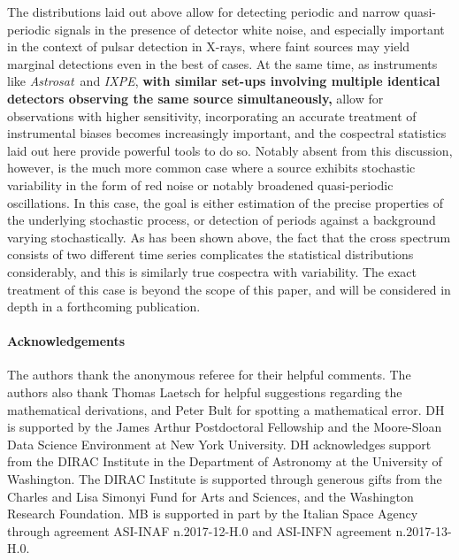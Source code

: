 \documentclass[12pt]{emulateapj}
\newcommand{\project}[1]{\textsl{#1}}
\newcommand{\astrosat}{\project{Astrosat}\xspace}
\newcommand{\ixpe}{\project{IXPE}\xspace}
\begin{document}
The distributions laid out above allow for detecting periodic and narrow quasi-periodic signals in the presence of detector white noise, and especially important in the context of pulsar detection in X-rays, where faint sources may yield marginal detections even in the best of cases. At the same time, as instruments like \astrosat\ and \ixpe, \textbf{with similar set-ups involving multiple identical detectors observing the same source simultaneously,} allow for observations with higher sensitivity, incorporating an accurate treatment of instrumental biases becomes increasingly important, and the cospectral statistics laid out here provide powerful tools to do so.
Notably absent from this discussion, however, is the much more common case where a source exhibits stochastic variability in the form of red noise or notably broadened quasi-periodic oscillations. In this case, the goal is either estimation of the precise properties of the underlying stochastic process, or detection of periods against a background varying stochastically. As has been shown above, the fact that the cross spectrum consists of two different time series complicates the statistical distributions considerably, and this is similarly true cospectra with variability. The exact treatment of this case is beyond the scope of this paper, and will be considered in depth in a forthcoming publication. 


\paragraph{Acknowledgements}
The authors thank the anonymous referee for their helpful comments.
The authors also thank Thomas Laetsch for helpful suggestions regarding the mathematical derivations, and Peter Bult for spotting a mathematical error.
DH is supported by the James Arthur Postdoctoral Fellowship and the Moore-Sloan Data Science Environment at New York University. 
DH acknowledges support from the DIRAC Institute in the Department of Astronomy at the University of Washington. The DIRAC Institute is supported through generous gifts from the Charles and Lisa Simonyi Fund for Arts and Sciences, and the Washington Research Foundation.
MB is supported in part by the Italian Space Agency through agreement ASI-INAF n.2017-12-H.0 and ASI-INFN agreement n.2017-13-H.0.







\end{document}
